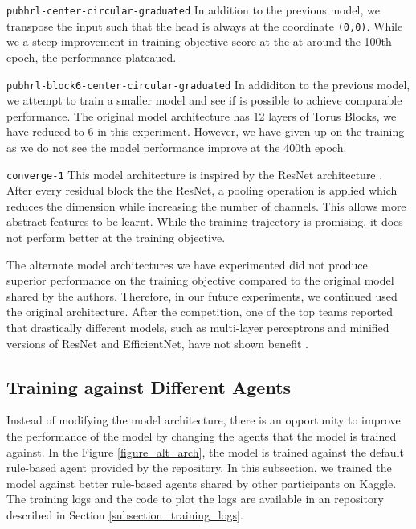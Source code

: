 \verb|pubhrl-center-circular-graduated|\newline
In addition to the previous model, we transpose the input such that the head is always at the coordinate \verb|(0,0)|. While we a steep improvement in training objective score at the at around the 100th epoch, the performance plateaued.

\verb|pubhrl-block6-center-circular-graduated|\newline
In addiditon to the previous model, we attempt to train a smaller model and see if is possible to achieve comparable performance. The original model architecture has 12 layers of Torus Blocks, we have reduced to 6 in this experiment. However, we have given up on the training as we do not see the model performance improve at the 400th epoch.

\verb|converge-1|\newline
This model architecture is inspired by the ResNet architecture \cite{paper_resnet}. After every residual block the the ResNet, a pooling operation is applied which reduces the dimension while increasing the number of channels. This allows more abstract features to be learnt. While the training trajectory is promising, it does not perform better at the training objective.

The alternate model architectures we have experimented did not produce superior performance on the training objective compared to the original model shared by the authors. Therefore, in our future experiments, we continued used the original architecture. After the competition, one of the top teams reported that drastically different models, such as multi-layer perceptrons and minified versions of ResNet and EfficientNet, have not shown benefit  \cite{sharing_robga}.

\subsection{Training against Different Agents}
\label{subsection_training_against_different_agents}

Instead of modifying the model architecture, there is an opportunity to improve the performance of the model by changing the agents that the model is trained against. In the Figure \ref{figure_alt_arch}, the model is trained against the default rule-based agent provided by the repository. In this subsection, we trained the model against better rule-based agents shared by other participants on Kaggle. The training logs and the code to plot the logs are available in an repository described in Section \ref{subsection_training_logs}.

